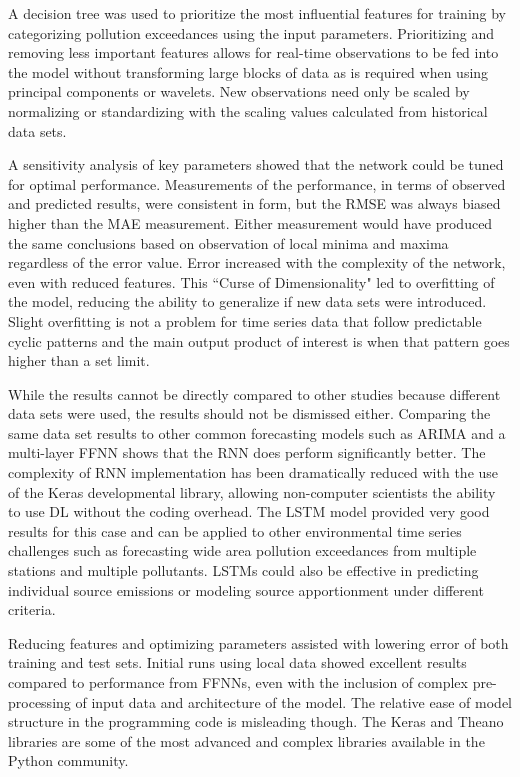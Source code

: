 A decision tree was used to prioritize the most influential features for training by categorizing pollution exceedances using the input parameters. Prioritizing and removing less important features allows for real-time observations to be fed into the model without transforming large blocks of data as is required when using principal components or wavelets. New observations need only be scaled by normalizing or standardizing with the scaling values calculated from historical data sets. 

A sensitivity analysis of key parameters showed that the network could be tuned for optimal performance. Measurements of the performance, in terms of observed and predicted results, were consistent in form, but the RMSE was always biased higher than the MAE measurement. Either measurement would have produced the same conclusions based on observation of local minima and maxima regardless of the error value. Error increased with the complexity of the network, even with reduced features. This ``Curse of Dimensionality" led to overfitting of the model, reducing the ability to generalize if new data sets were introduced. Slight overfitting is not a problem for time series data that follow predictable cyclic patterns and the main output product of interest is when that pattern goes higher than a set limit.

While the results cannot be directly compared to other studies because different data sets were used, the results should not be dismissed either. Comparing the same data set results to other common forecasting models such as ARIMA and a multi-layer FFNN shows that the RNN does perform significantly better. The complexity of RNN implementation has been dramatically reduced with the use of the Keras developmental library, allowing non-computer scientists the ability to use DL without the coding overhead. The LSTM model provided very good results for this case and can be applied to other environmental time series challenges such as forecasting wide area pollution exceedances from multiple stations and multiple pollutants. LSTMs could also be effective in predicting individual source emissions or modeling source apportionment under different criteria. 

Reducing features and optimizing parameters assisted with lowering error of both training and test sets. Initial runs using local data showed excellent results compared to performance from FFNNs, even with the inclusion of complex pre-processing of input data and architecture of the model. The relative ease of model structure in the programming code is misleading though. The Keras and Theano libraries are some of the most advanced and complex libraries available in the Python community. 

